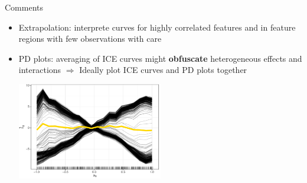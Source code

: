 \documentclass[11pt,compress,t,notes=noshow, aspectratio=169, xcolor=table]{beamer}
\begin{document}
\begin{frame}{Comments}
\begin{itemize}
\item Extrapolation: interprete curves for highly correlated features and in feature regions with few observations with care

\item PD plots: averaging of ICE curves might \textbf{obfuscate} heterogeneous effects and interactions \newline \(\Rightarrow\) Ideally plot ICE curves and PD plots together

\begin{center}\includegraphics[width=0.5\textwidth]{figure/pdp_xor.pdf} \end{center}
\end{itemize}

\end{frame}


\endlecture
\end{document}
